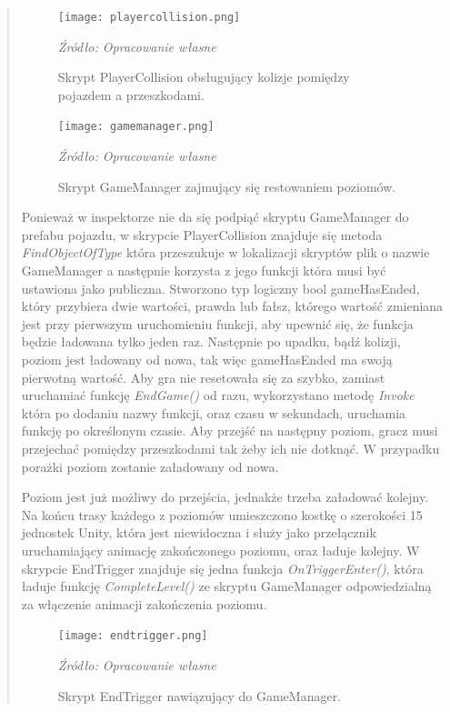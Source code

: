 \begin{quotation}
\begin{figure}[!hbt]
\centering
  \texttt{[image: playercollision.png]}
  \caption{Skrypt PlayerCollision obsługujący kolizje pomiędzy pojazdem a przeszkodami.}\label{rys_7}
  \begin{minipage}[t]{0.75\linewidth}
    \emph{Źródło: Opracowanie własne}
  \end{minipage}
\end{figure}
\begin{figure}[!hbt]
\centering
  \texttt{[image: gamemanager.png]}
  \caption{Skrypt GameManager zajmujący się restowaniem poziomów.}\label{rys_8}
  \begin{minipage}[t]{0.75\linewidth}
    \emph{Źródło: Opracowanie własne}
  \end{minipage}
\end{figure}

\newpage
\hfill \break
\hfill \break
\indent Ponieważ w inspektorze nie da się podpiąć skryptu GameManager do prefabu pojazdu, w skrypcie PlayerCollision znajduje się metoda \textit{FindObjectOfType} która przeszukuje w lokalizacji skryptów plik o nazwie GameManager a następnie korzysta z jego funkcji która musi być ustawiona jako publiczna. Stworzono typ logiczny bool gameHasEnded, który przybiera dwie wartości, prawda lub fałsz, którego wartość zmieniana jest przy pierwszym uruchomieniu funkcji, aby upewnić się, że funkcja będzie ładowana tylko jeden raz. Następnie po upadku, bądź kolizji, poziom jest ładowany od nowa, tak więc gameHasEnded ma swoją pierwotną wartość. Aby gra nie resetowała się za szybko, zamiast uruchamiać funkcję \textit{EndGame()} od razu, wykorzystano metodę \textit{Invoke} która po dodaniu nazwy funkcji, oraz czasu w sekundach, uruchamia funkcję po określonym czasie. Aby przejść na następny poziom, gracz musi przejechać pomiędzy przeszkodami tak żeby ich nie dotknąć. W przypadku porażki poziom zostanie załadowany od nowa.

\indent Poziom jest już możliwy do przejścia, jednakże trzeba załadować kolejny. Na końcu trasy każdego z poziomów umieszczono kostkę o szerokości 15 jednostek Unity, która jest niewidoczna i służy jako przełącznik uruchamiający animację zakończonego poziomu, oraz ładuje kolejny. W skrypcie EndTrigger znajduje się jedna funkcja \textit{OnTriggerEnter()}, która ładuje funkcję \textit{CompleteLevel()} ze skryptu GameManager odpowiedzialną za włączenie animacji zakończenia poziomu.

\begin{figure}[!ht]
\centering
  \texttt{[image: endtrigger.png]}
  \caption{Skrypt EndTrigger nawiązujący do GameManager.}\label{rys_9}
  \begin{minipage}[t]{0.75\linewidth}
    \emph{Źródło: Opracowanie własne}
  \end{minipage}
\end{figure}


\end{quotation}

